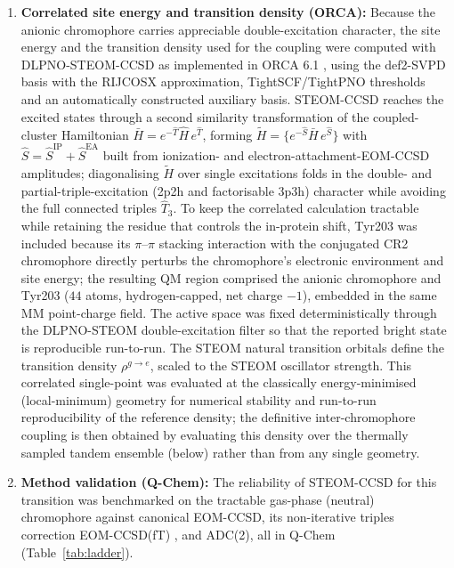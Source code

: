 \documentclass[journal=jpcbfk, manuscript=article, layout=twocolumn, doi=true]{achemso}
\begin{document}
\begin{enumerate}
    \item \textbf{Correlated site energy and transition density (ORCA):} Because the anionic chromophore carries appreciable double-excitation character, the site energy and the transition density used for the coupling were computed with DLPNO-STEOM-CCSD \cite{nooijen1997steom,dutta2016dlpno,dutta2018ipeom,dutta2019eaeom,riplinger2013dlpno} as implemented in ORCA 6.1 \cite{neese2020orca,neese2022orca}, using the def2-SVPD basis \cite{weigend2005def2,rappoport2010svpd} with the RIJCOSX approximation, TightSCF/TightPNO thresholds and an automatically constructed auxiliary basis. STEOM-CCSD reaches the excited states through a second similarity transformation of the coupled-cluster Hamiltonian $\bar H = e^{-\hat T}\hat H\,e^{\hat T}$, forming $\tilde H = \{e^{-\hat S}\bar H\,e^{\hat S}\}$ with $\hat S = \hat S^{\mathrm{IP}} + \hat S^{\mathrm{EA}}$ built from ionization- and electron-attachment-EOM-CCSD amplitudes; diagonalising $\tilde H$ over single excitations folds in the double- and partial-triple-excitation (2p2h and factorisable 3p3h) character while avoiding the full connected triples $\hat T_3$. To keep the correlated calculation tractable while retaining the residue that controls the in-protein shift, Tyr203 was included because its $\pi$--$\pi$ stacking interaction with the conjugated CR2 chromophore directly perturbs the chromophore's electronic environment and site energy; the resulting QM region comprised the anionic chromophore and Tyr203 ($44$ atoms, hydrogen-capped, net charge $-1$), embedded in the same MM point-charge field. The active space was fixed deterministically through the DLPNO-STEOM double-excitation filter so that the reported bright state is reproducible run-to-run. The STEOM natural transition orbitals define the transition density $\rho^{g\to e}$, scaled to the STEOM oscillator strength. This correlated single-point was evaluated at the classically energy-minimised (local-minimum) geometry for numerical stability and run-to-run reproducibility of the reference density; the definitive inter-chromophore coupling is then obtained by evaluating this density over the thermally sampled tandem ensemble (below) rather than from any single geometry.

    \item \textbf{Method validation (Q-Chem):} The reliability of STEOM-CCSD for this transition was benchmarked on the tractable gas-phase (neutral) chromophore against canonical EOM-CCSD, its non-iterative triples correction EOM-CCSD(fT) \cite{manohar2008ft}, and ADC(2), all in Q-Chem \cite{epifanovsky2021qchem} (Table~\ref{tab:ladder}).


\end{enumerate}
\end{document}
